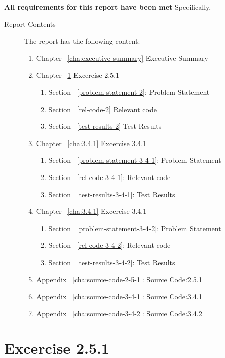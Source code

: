 \documentclass{report}
\begin{document}
\textbf{All requirements for this report have been met} Specifically,
\begin{description}
	\item[Report Contents]
	The report has the following content:
	\begin{enumerate}[{}]
		\item Chapter ~\ref{cha:executive-summary} Executive Summary
		\item Chapter ~\ref{cha:2.5.1} Excercise 2.5.1
		\begin{enumerate}
			\item Section ~\ref{problem-statement-2}: Problem Statement
			\item Section ~\ref{rel-code-2} Relevant code
			\item Section ~\ref{test-results-2} Test Results
		\end{enumerate}
		\item Chapter ~\ref{cha:3.4.1} Excercise 3.4.1
		\begin{enumerate}[{}]
			\item Section ~\ref{problem-statement-3-4-1}: Problem Statement
			\item Section ~\ref{rel-code-3-4-1}: Relevant code
			\item Section ~\ref{test-results-3-4-1}: Test Results
		\end{enumerate}
		\item Chapter ~\ref{cha:3.4.1} Excercise 3.4.1
		\begin{enumerate}[{}]
			\item Section ~\ref{problem-statement-3-4-2}: Problem Statement
			\item Section ~\ref{rel-code-3-4-2}: Relevant code
			\item Section ~\ref{test-results-3-4-2}: Test Results
		\end{enumerate}
		\item Appendix ~\ref{cha:source-code-2-5-1}: Source Code:2.5.1
		\item Appendix ~\ref{cha:source-code-3-4-1}: Source Code:3.4.1
		\item Appendix ~\ref{cha:source-code-3-4-2}: Source Code:3.4.2
	\end{enumerate}
\end{description}


\chapter{Excercise 2.5.1}
\label{cha:2.5.1}
\end{document}
